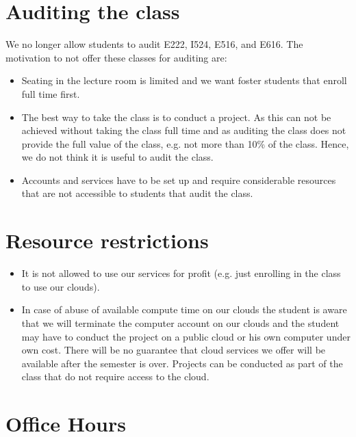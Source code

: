 \section{Auditing the class}\label{auditing-the-class}

We no longer allow students to audit E222, I524, E516, and E616. The
motivation to not offer these classes for auditing are:

\begin{itemize}
\item Seating in the lecture room is limited and we want foster
  students that enroll full time first.

\item The best way to take the class is to conduct a project. As this
  can not be achieved without taking the class full time and as
  auditing the class does not provide the full value of the class,
  e.g. not more than 10\% of the class. Hence, we do not think it is
  useful to audit the class.

\item  Accounts and services have to be set up and require
  considerable resources that are not accessible to students that
  audit the class.

\end{itemize}


\section{Resource restrictions}

\begin{itemize}
\item It is not allowed to use our services for profit (e.g. just
  enrolling in the class to use our clouds).
\item In case of abuse of available compute time on our clouds the
  student is aware that we will terminate the computer account on our
  clouds and the student may have to conduct the project on a public cloud or
  his own computer under own cost. There will be no guarantee that
  cloud services we offer will be available after the semester is
  over.  Projects can be conducted as part of the class that do not
  require access to the cloud.
\end{itemize}

\section{Office Hours}\label{office-hours}

